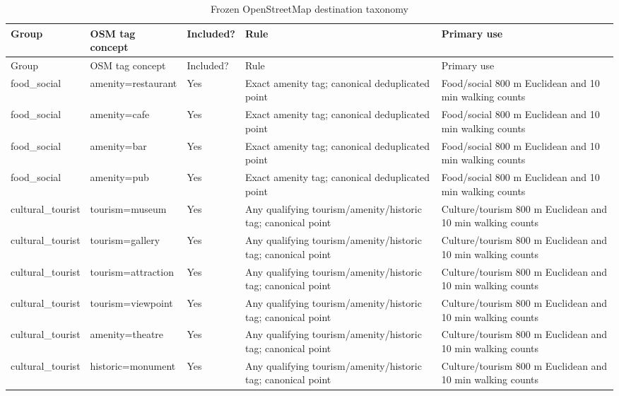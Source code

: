 \begin{landscape}
\small
\begin{longtable}{>{\raggedright\arraybackslash}p{2.3cm}>{\raggedright\arraybackslash}p{5.1cm}>{\raggedright\arraybackslash}p{2.0cm}>{\raggedright\arraybackslash}p{6.0cm}>{\raggedright\arraybackslash}p{5.2cm}}
\caption{Frozen OpenStreetMap destination taxonomy}\label{tab:destination-taxonomy}\\
\toprule
Group & OSM tag concept & Included? & Rule & Primary use \\
\midrule
\endfirsthead
\toprule
Group & OSM tag concept & Included? & Rule & Primary use \\
\midrule
\endhead
food\_\allowbreak{}social & amenity=restaurant & Yes & Exact amenity tag; canonical deduplicated point & Food/social 800 m Euclidean and 10 min walking counts \\
food\_\allowbreak{}social & amenity=cafe & Yes & Exact amenity tag; canonical deduplicated point & Food/social 800 m Euclidean and 10 min walking counts \\
food\_\allowbreak{}social & amenity=bar & Yes & Exact amenity tag; canonical deduplicated point & Food/social 800 m Euclidean and 10 min walking counts \\
food\_\allowbreak{}social & amenity=pub & Yes & Exact amenity tag; canonical deduplicated point & Food/social 800 m Euclidean and 10 min walking counts \\
cultural\_\allowbreak{}tourist & tourism=museum & Yes & Any qualifying tourism/amenity/historic tag; canonical point & Culture/tourism 800 m Euclidean and 10 min walking counts \\
cultural\_\allowbreak{}tourist & tourism=gallery & Yes & Any qualifying tourism/amenity/historic tag; canonical point & Culture/tourism 800 m Euclidean and 10 min walking counts \\
cultural\_\allowbreak{}tourist & tourism=attraction & Yes & Any qualifying tourism/amenity/historic tag; canonical point & Culture/tourism 800 m Euclidean and 10 min walking counts \\
cultural\_\allowbreak{}tourist & tourism=viewpoint & Yes & Any qualifying tourism/amenity/historic tag; canonical point & Culture/tourism 800 m Euclidean and 10 min walking counts \\
cultural\_\allowbreak{}tourist & amenity=theatre & Yes & Any qualifying tourism/amenity/historic tag; canonical point & Culture/tourism 800 m Euclidean and 10 min walking counts \\
cultural\_\allowbreak{}tourist & historic=monument & Yes & Any qualifying tourism/amenity/historic tag; canonical point & Culture/tourism 800 m Euclidean and 10 min walking counts \\

\end{longtable}
\end{landscape}

